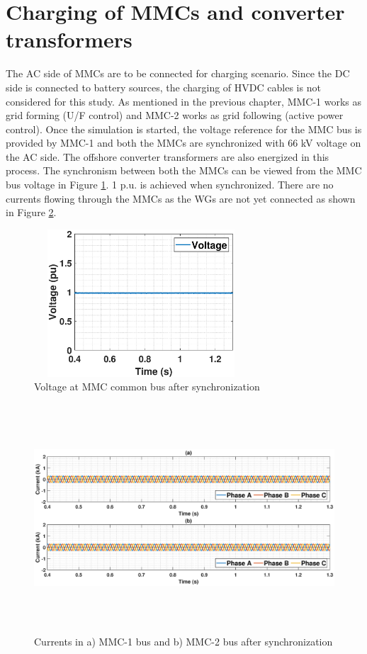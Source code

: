 \section{Charging of MMCs and converter transformers}
The \gls{AC} side of \gls{MMC}s are to be connected for charging scenario. Since the \gls{DC} side is connected to battery sources, the charging of \gls{HVDC} cables is not considered for this study. As mentioned in the previous chapter, \gls{MMC}-1 works as grid forming (U/F control) and \gls{MMC}-2 works as grid following (active power control). Once the simulation is started, the voltage reference for the \gls{MMC} bus is provided by \gls{MMC}-1 and both the \gls{MMC}s are synchronized with 66 kV voltage on the \gls{AC} side. The offshore converter transformers are also energized in this process. The synchronism between both the \gls{MMC}s can be viewed from the \gls{MMC} bus voltage in Figure \ref{fig:VACP_MMC_1_2_sync}. 1 p.u. is achieved when synchronized. There are no currents flowing through the \gls{MMC}s as the \gls{WG}s are not yet connected as shown in Figure \ref{fig:IABC_MMC_1_2_sync}.

\begin{figure}[H]
\centering
    \includegraphics[height = 5.5cm,width = 8cm]{Diagrams/Chapter_5/VACP_MMC_1_2_sync.eps}
    \caption{Voltage at MMC common bus after synchronization}
    \label{fig:VACP_MMC_1_2_sync}
\end{figure}

\begin{figure}[H]
\hspace*{-1.2cm}
    \includegraphics[height = 8.5cm,width = 18.5cm]{Diagrams/Chapter_5/IABC_MMC_1_2_sync.eps}
    \caption{Currents in a) MMC-1 bus and b) MMC-2 bus after synchronization}
    \label{fig:IABC_MMC_1_2_sync}
\end{figure}

